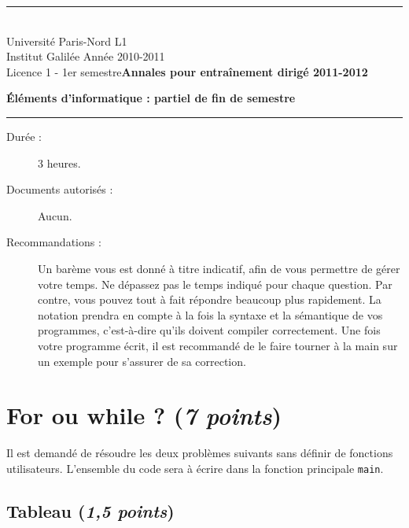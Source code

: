 \renewcommand{\entete}[1]{%
\noindent
\rule{\linewidth}{0.5mm}\\
\noindent
Universit\'e Paris-Nord \hfill L1\\
\noindent
Institut Galil\'ee \hfill Ann\'ee 2010-2011\\
Licence 1 - 1er semestre\hfill \textbf{Annales pour entraînement
  dirigé 2011-2012}
\begin{center}
\Large\bf #1
\end{center}
\rule{\linewidth}{0.5mm}
\vspace{1cm}
}

\setcounter{questioncount}{0}
\newcommand{\question}{\addtocounter{questioncount}{1}\paragraph{Question \Alph{questioncount}.}}
\newcommand{\commentaire}[1]{}
\newcommand{\pt}[1]{\fbox{$#1 \operatorname{pt}$}}

\entete{Éléments d'informatique : partiel de fin de semestre}
\vspace{-1cm}
\begin{description}
\item[Durée :] 3 heures.
\item[Documents autorisés :] Aucun.
\item[Recommandations :] Un barème vous est donné à
titre indicatif, afin de vous permettre de gérer votre temps. Ne
dépassez pas le temps indiqué pour chaque question. Par contre, vous
pouvez tout à fait répondre beaucoup plus rapidement. La
notation prendra en compte à la fois la syntaxe et la sémantique de
vos programmes, c'est-à-dire qu'ils doivent compiler correctement. Une
fois votre programme écrit, il est recommandé de le faire tourner à la
main sur un exemple pour s'assurer de sa correction.
\end{description}


\section{For ou while ? (\emph{7 points})}

Il est demandé de résoudre les deux problèmes suivants sans définir de fonctions utilisateurs.
L'ensemble du code sera à écrire dans la fonction principale
\verb|main|.

\subsection*{Tableau (\emph{1,5 points})}

